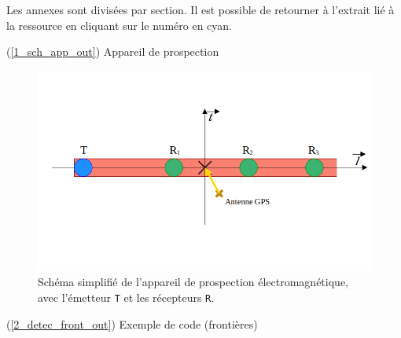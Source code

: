 \documentclass[12pt]{article}
\begin{document}
    Les annexes sont divisées par section. Il est possible de retourner à l'extrait lié à la ressource en cliquant sur le numéro en cyan.

    \label{1_sch_app_in} (\ref{1_sch_app_out}) Appareil de prospection

    \begin{figure}[ht!]
        \centering
        \includegraphics[width=\textwidth]{Images/SepVoies_Sch1.png}  
        \caption{Schéma simplifié de l'appareil de prospection électromagnétique, avec l'émetteur \texttt{T} et les récepteurs \texttt{R}.}
    \end{figure}

\newpage
    \label{2_detec_front_in} (\ref{2_detec_front_out}) Exemple de code (frontières)
    
\end{document}
